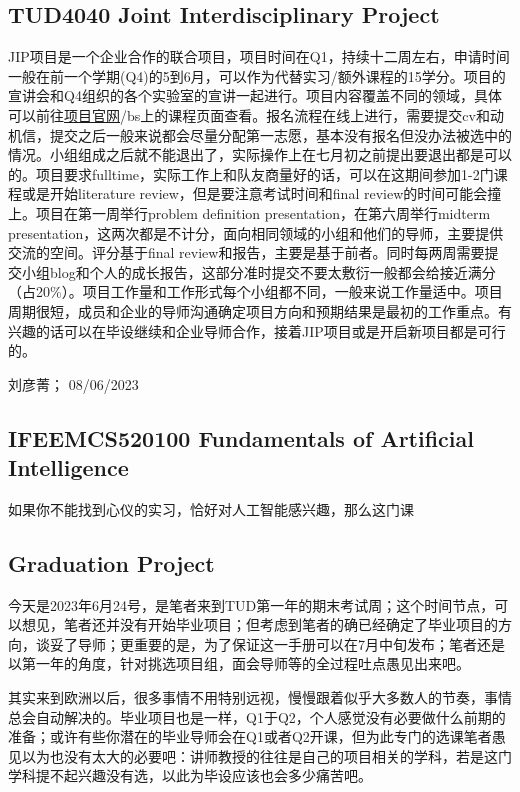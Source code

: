 \subsection{TUD4040 Joint Interdisciplinary Project}
JIP项目是一个企业合作的联合项目，项目时间在Q1，持续十二周左右，申请时间一般在前一个学期(Q4)的5到6月，可以作为代替实习/额外课程的15学分。项目的宣讲会和Q4组织的各个实验室的宣讲一起进行。项目内容覆盖不同的领域，具体可以前往\href{https://www.jointinterdisciplinaryproject.nl/}{\uline{项目官网}}/bs上的课程页面查看。报名流程在线上进行，需要提交cv和动机信，提交之后一般来说都会尽量分配第一志愿，基本没有报名但没办法被选中的情况。小组组成之后就不能退出了，实际操作上在七月初之前提出要退出都是可以的。项目要求fulltime，实际工作上和队友商量好的话，可以在这期间参加1-2门课程或是开始literature review，但是要注意考试时间和final review的时间可能会撞上。项目在第一周举行problem definition presentation，在第六周举行midterm presentation，这两次都是不计分，面向相同领域的小组和他们的导师，主要提供交流的空间。评分基于final review和报告，主要是基于前者。同时每两周需要提交小组blog和个人的成长报告，这部分准时提交不要太敷衍一般都会给接近满分（占20\%）。项目工作量和工作形式每个小组都不同，一般来说工作量适中。项目周期很短，成员和企业的导师沟通确定项目方向和预期结果是最初的工作重点。有兴趣的话可以在毕设继续和企业导师合作，接着JIP项目或是开启新项目都是可行的。

\begin{flushright}
刘彦菁； 08/06/2023
\end{flushright}
\subsection{IFEEMCS520100 Fundamentals of Artificial Intelligence}
如果你不能找到心仪的实习，恰好对人工智能感兴趣，那么这门课

\subsection{Graduation Project}

今天是2023年6月24号，是笔者来到TUD第一年的期末考试周；这个时间节点，可以想见，笔者还并没有开始毕业项目；但考虑到笔者的确已经确定了毕业项目的方向，谈妥了导师；更重要的是，为了保证这一手册可以在7月中旬发布；笔者还是以第一年的角度，针对挑选项目组，面会导师等的全过程吐点愚见出来吧。

其实来到欧洲以后，很多事情不用特别远视，慢慢跟着似乎大多数人的节奏，事情总会自动解决的。毕业项目也是一样，Q1于Q2，个人感觉没有必要做什么前期的准备；或许有些你潜在的毕业导师会在Q1或者Q2开课，但为此专门的选课笔者愚见以为也没有太大的必要吧：讲师教授的往往是自己的项目相关的学科，若是这门学科提不起兴趣没有选，以此为毕设应该也会多少痛苦吧。


